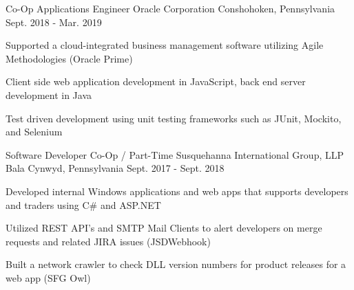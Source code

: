 

\begin{cventries}

  \cventry
    {Co-Op Applications Engineer} %
    {Oracle Corporation} %
    {Conshohoken, Pennsylvania} %
    {Sept. 2018 - Mar. 2019} %
    {
      \begin{cvitems} %
        \item Supported a cloud-integrated business management software utilizing Agile Methodologies (Oracle Prime)
        \item Client side web application development in JavaScript, back end server development in Java
        \item Test driven development using unit testing frameworks such as JUnit, Mockito, and Selenium
      \end{cvitems}
    }

  \cventry
    {Software Developer Co-Op / Part-Time} %
    {Susquehanna International Group, LLP} %
    {Bala Cynwyd, Pennsylvania} %
    {Sept. 2017 - Sept. 2018} %
    {
      \begin{cvitems} %
        \item Developed internal Windows applications and web apps that supports developers and traders using C\# and ASP.NET
        \item Utilized REST API's and SMTP Mail Clients to alert developers on merge requests and related JIRA issues (JSDWebhook)
        \item Built a network crawler to check DLL version numbers for product releases for a web app (SFG Owl)
      \end{cvitems}
    }


\end{cventries}
